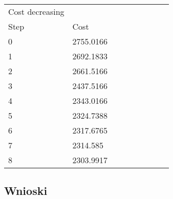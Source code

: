 \begin{longtable}{lllllllll}
Cost decreasing &              &           &                  &    &    &    &   &    \\
Step                     & Cost         &           &                  &    &    &    &   &    \\
0                        & 2755.0166    &           &                  &    &    &    &   &    \\
1                        & 2692.1833    &           &                  &    &    &    &   &    \\
2                        & 2661.5166    &           &                  &    &    &    &   &    \\
3                        & 2437.5166    &           &                  &    &    &    &   &    \\
4                        & 2343.0166    &           &                  &    &    &    &   &    \\
5                        & 2324.7388    &           &                  &    &    &    &   &    \\
6                        & 2317.6765    &           &                  &    &    &    &   &    \\
7                        & 2314.585     &           &                  &    &    &    &   &    \\
8                        & 2303.9917    &           &                  &    &    &    &   &
\end{longtable}


\subsection{Wnioski}
